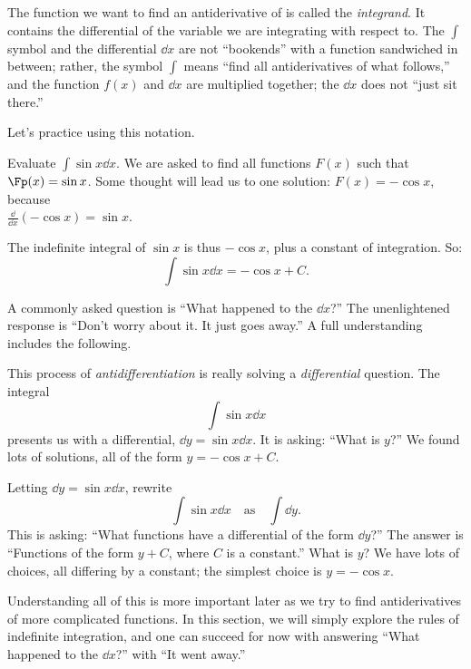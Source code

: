 The function we want to find an antiderivative of is called the \emph{integrand}. It contains the differential of the variable we are integrating with respect to. The $\int$ symbol and the differential $\dd x$ are not ``bookends'' with a function sandwiched in between; rather, the symbol $\int$ means ``find all antiderivatives of what follows,'' and the function $f(x)$ and $\dd x$ are multiplied together; the $\dd x$ does not ``just sit there.''

Let's practice using this notation.

\begin{example}\label{ex_anti2}%
Evaluate $\displaystyle \int \sin x\dd x$.
\solution
We are asked to find all functions $F(x)$ such that $\Fp(x) = \sin x$. Some thought will lead us to one solution: $F(x) = -\cos x$, because\\
$\frac{\dd}{\dd x}(-\cos x) = \sin x$.

The indefinite integral of $\sin x$ is thus $-\cos x$, plus a constant of integration. So:
\[\int \sin x \dd x = -\cos x + C.\]
\end{example}

A commonly asked question is ``What happened to the $\dd x$?'' The unenlightened response is ``Don't worry about it. It just goes away.'' A full understanding includes the following.


This process of \emph{antidifferentiation} is really solving a \emph{differential} question. The integral
\[\int \sin x\dd x\]
presents us with a differential, $\dd y = \sin x\dd x$. It is asking: ``What is $y$?'' We found lots of solutions, all of the form $y = -\cos x+C$.

Letting $\dd y = \sin x\dd x$,  rewrite 
\[\int \sin x \dd x \quad \text{as}\quad \int \dd y.\]
This is asking: ``What functions have a differential of the form $\dd y$?'' The answer is ``Functions of the form $y+C$, where $C$ is a constant.'' What is $y$? We have lots of choices, all differing by a constant; the simplest choice is $y = -\cos x$.

Understanding all of this is more important later as we try to find antiderivatives of more complicated functions. In this section, we will simply explore the rules of indefinite integration, and one can succeed for now with answering ``What happened to the $\dd x$?'' with ``It went away.''

